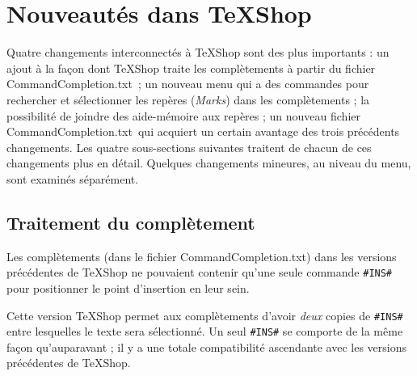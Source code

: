 \documentclass[11pt,french]{article}
\newcommand{\TS}{\textsf{\TeX Shop}}
\newcommand{\CCT}{\textsf{CommandCompletion.txt}}
\begin{document}
\section*{Nouveautés dans \TS}

Quatre changements interconnectés à \TS{} sont des plus importants : un ajout à la façon dont \TS{} traite 
les complètements à partir du fichier \CCT\ ; un nouveau menu qui a des commandes pour 
rechercher et sélectionner les repères (\emph{Marks}) dans les complètements ; la possibilité de joindre des aide-mémoire aux repères ; un nouveau fichier \CCT\ qui acquiert un certain avantage 
des trois précédents changements. Les quatre sous-sections suivantes traitent de chacun de ces changements plus 
en détail. Quelques changements mineures, au niveau du menu, sont examinés séparément.


\subsection*{Traitement du complètement}

Les complètements (dans le fichier \CCT) dans les versions précédentes de \TS{} ne 
pouvaient contenir qu'une seule commande \texttt{\#INS\#} pour positionner le point d'insertion en leur sein. 

Cette version \TS{} permet aux complètements d'avoir \emph{deux} copies de \texttt{\#INS\#} entre lesquelles le texte sera sélectionné. Un seul \texttt{\#INS\#} se comporte de la même façon qu'auparavant ; il y a une totale compatibilité ascendante avec les versions précédentes de \TS.

%
\end{document}
